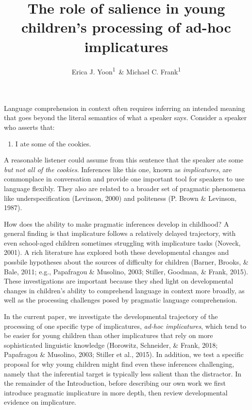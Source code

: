 \documentclass[man]{apa6}
\title{The role of salience in young children's processing of ad-hoc
implicatures}
\author{Erica J. Yoon\textsuperscript{1}~\& Michael C. Frank\textsuperscript{1}}
\affiliation{
    \vspace{0.5cm}
          \textsuperscript{1} Stanford University  }
\providecommand{\tightlist}{%
  \setlength{\itemsep}{0pt}\setlength{\parskip}{0pt}}
\theoremstyle{definition}
\theoremstyle{definition}
\theoremstyle{definition}
\theoremstyle{remark}
\begin{document}
\maketitle

\setcounter{secnumdepth}{0}



Language comprehension in context often requires inferring an intended
meaning that goes beyond the literal semantics of what a speaker says.
Consider a speaker who asserts that:

\begin{enumerate}
\def\labelenumi{(\arabic{enumi})}
\tightlist
\item
  I ate some of the cookies.
\end{enumerate}

\noindent A reasonable listener could assume from this sentence that the
speaker ate some \emph{but not all of the cookies}. Inferences like this
one, known as \emph{implicatures}, are commonplace in conversation and
provide one important tool for speakers to use language flexibly. They
also are related to a broader set of pragmatic phenomena like
underspecification (Levinson, 2000) and politeness (P. Brown \&
Levinson, 1987).

How does the ability to make pragmatic inferences develop in childhood?
A general finding is that implicature follows a relatively delayed
trajectory, with even school-aged children sometimes struggling with
implicature tasks (Noveck, 2001). A rich literature has explored both
these developmental changes and possbile hypotheses about the sources of
difficulty for children (Barner, Brooks, \& Bale, 2011; e.g., Papafragou
\& Musolino, 2003; Stiller, Goodman, \& Frank, 2015). These
investigations are important because they shed light on developmental
changes in children's ability to comprehend language in context more
broadly, as well as the processing challenges posed by pragmatic
language comprehension.

In the current paper, we investigate the developmental trajectory of the
processing of one specific type of implicatures, \emph{ad-hoc
implicatures}, which tend to be easier for young children than other
implicatures that rely on more sophisticated linguistic knowledge
(Horowitz, Schneider, \& Frank, 2018; Papafragou \& Musolino, 2003;
Stiller et al., 2015). In addition, we test a specific proposal for why
young children might find even these inferences challenging, namely that
the inferential target is typically less salient than the distractor. In
the remainder of the Introduction, before describing our own work we
first introduce pragmatic implicature in more depth, then review
developmental evidence on implicature.
\end{document}
